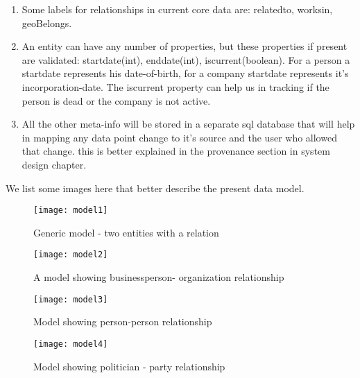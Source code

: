 \begin {enumerate}
\item  Some labels for relationships in current core data are: relatedto, worksin, geoBelongs.

\item An entity can have any number of properties, but these properties if present are validated: startdate(int), enddate(int), iscurrent(boolean). For a person a startdate represents his date-of-birth, for a company startdate represents it's incorporation-date. The iscurrent property can help us in tracking if the person is dead or the company is not active.

\item All the other meta-info will be stored in a separate sql database that will help in mapping any data point change to it's source and the user who allowed that change. this is better explained in the provenance section in system design chapter.

\end{enumerate}

We list some images here that better describe the present data model. 

\begin{figure}[H]
\begin{center}	
\texttt{[image: model1]} 
\caption{Generic model - two entities with a relation}
\label{fig:model1}
\end{center}
\end{figure}

\begin{figure}[H]
\begin{center}	
\texttt{[image: model2]} 
\caption{A model showing businessperson- organization relationship }
\label{fig:model2}
\end{center}
\end{figure}

\begin{figure}[H]
\begin{center}	
\texttt{[image: model3]} 
\caption{Model showing person-person relationship}
\label{fig:model3}
\end{center}
\end{figure}

\begin{figure}[H]
\begin{center}	
\texttt{[image: model4]} 
\caption{Model showing politician - party relationship }
\label{fig:model4}
\end{center}
\end{figure}

